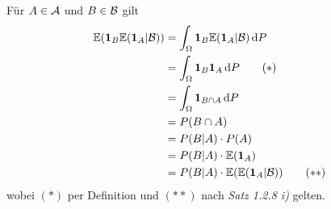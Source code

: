\documentclass[12pt]{scrartcl}
\begin{document}
Für $A\in\mathcal{A}$ und $B\in\mathcal{B}$ gilt
\begin{align*}
\mathbb{E}(\textbf{1}_B \mathbb{E}(\textbf{1}_A|\mathcal{B}))
&= \int_{\Omega}\textbf{1}_B\mathbb{E}(\textbf{1}_A|\mathcal{B})\mathop{}\!\mathrm{d} P \\
&= \int_{\Omega}\textbf{1}_B\textbf{1}_A\mathop{}\!\mathrm{d} P \tag{$\ast$} \\
&= \int_{\Omega}\textbf{1}_{B\cap A}\mathop{}\!\mathrm{d} P \\
&= P(B\cap A) \\
&= P(B|A)\cdot P(A) \\
&= P(B|A)\cdot \mathbb{E}(\textbf{1}_A) \\
&= P(B|A)\cdot \mathbb{E}(\mathbb{E}(\textbf{1}_A|\mathcal{B})) \tag{$\ast\ast$} 
\end{align*}
wobei $(\ast)$ per Definition und $(\ast\ast)$ nach \textit{Satz 1.2.8 i)} gelten.

\ausruecken
\end{document}
